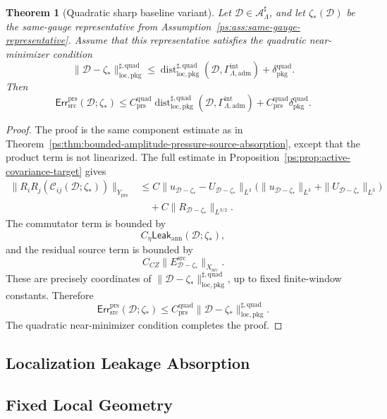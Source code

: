 \documentclass[11pt]{article}
\numberwithin{equation}{section}
\newtheorem{theorem}{Theorem}[section]
\theoremstyle{definition}
\theoremstyle{remark}
\newcommand{\loc}{\mathrm{loc}}
\newcommand{\pkg}{\mathrm{pkg}}
\newcommand{\adm}{\mathrm{adm}}
\newcommand{\prs}{\mathrm{prs}}
\newcommand{\src}{\mathrm{src}}
\newcommand{\Err}{\mathsf{Err}}
\newcommand{\Leak}{\mathsf{Leak}}
\newcommand{\Dist}{\operatorname{dist}}
\newcommand{\calA}{\mathcal A}
\newcommand{\calD}{\mathcal D}
\newcommand{\Xsrc}{X_{\src}}
\newcommand{\Yprs}{Y_{\prs}}
\newcommand{\Gadm}{\Gamma^{\mathrm{int}}_{\Lambda,\adm}}
\begin{document}
\begin{theorem}[Quadratic sharp baseline variant]
\label{ps:thm:quadratic-sharp-target}
Let \(\calD\in\calA^\sharp_\Lambda\), and let \(\zeta_*(\calD)\) be the
same-gauge representative from Assumption~\ref{ps:ass:same-gauge-representative}.  Assume
that this representative satisfies the quadratic near-minimizer condition
\[
    \|\calD-\zeta_*\|_{\loc,\pkg}^{\sharp,\mathrm{quad}}
    \le
    \Dist_{\loc,\pkg}^{\sharp,\mathrm{quad}}(\calD,\Gadm)
    +
    \delta_{\pkg}^{\mathrm{quad}}.
\]
Then
\[
    \Err^{\prs}_{\src}(\calD;\zeta_*)
    \le
    C_{\prs}^{\mathrm{quad}}
    \Dist_{\loc,\pkg}^{\sharp,\mathrm{quad}}(\calD,\Gadm)
    +
    C_{\prs}^{\mathrm{quad}}\delta_{\pkg}^{\mathrm{quad}}.
\]
\end{theorem}

\begin{proof}
The proof is the same component estimate as in
Theorem~\ref{ps:thm:bounded-amplitude-pressure-source-absorption}, except that the
product term is not linearized.  The full estimate in
Proposition~\ref{ps:prop:active-covariance-target} gives
\[
\begin{aligned}
    \|R_iR_j(\mathcal C_{ij}(\calD;\zeta_*))\|_{\Yprs}
    &\le
    C
    \|u_{\calD-\zeta_*}-U_{\calD-\zeta_*}\|_{L^3}
    \bigl(
        \|u_{\calD-\zeta_*}\|_{L^3}
        +
        \|U_{\calD-\zeta_*}\|_{L^3}
    \bigr) \\
    &\quad+
    C\|R_{\calD-\zeta_*}\|_{L^{3/2}} .
\end{aligned}
\]
The commutator term is bounded by
\[
    C_\eta\Leak_{\mathrm{ann}}(\calD;\zeta_*),
\]
and the residual source term is bounded by
\[
    C_{CZ}\|E^{\src}_{\calD-\zeta_*}\|_{\Xsrc}.
\]
These are precisely coordinates of
\(\|\calD-\zeta_*\|_{\loc,\pkg}^{\sharp,\mathrm{quad}}\), up to fixed
finite-window constants.  Therefore
\[
    \Err^{\prs}_{\src}(\calD;\zeta_*)
    \le
    C_{\prs}^{\mathrm{quad}}
    \|\calD-\zeta_*\|_{\loc,\pkg}^{\sharp,\mathrm{quad}}.
\]
The quadratic near-minimizer condition completes the proof.
\end{proof}

\subsection*{Localization Leakage Absorption}
\subsection{Fixed Local Geometry}
\label{loc:sec:geometry}
\end{document}

